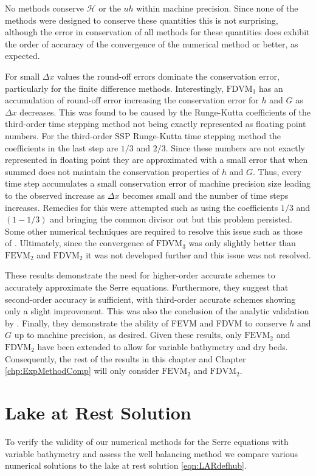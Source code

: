 No methods conserve $\mathcal{H}$ or the $uh$ within machine precision. Since none of the methods were designed to conserve these quantities this is not surprising, although the error in conservation of all methods for these quantities does exhibit the order of accuracy of the convergence of the numerical method or better, as expected. 

For small $\Delta x$ values the round-off errors dominate the conservation error, particularly for the finite difference methods. Interestingly, $\text{FDVM}_3$ has an accumulation of round-off error increasing the conservation error for $h$ and $G$ as $\Delta x$ decreases. This was found to be caused by the Runge-Kutta coefficients of the third-order time stepping method \cite{Zoppou-etal-2017} not being exactly represented as floating point numbers. For the third-order SSP Runge-Kutta time stepping method the coefficients in the last step are $1/3$ and $2/3$. Since these numbers are not exactly represented in floating point they are approximated with a small error that when summed does not maintain the conservation properties of $h$ and $G$. Thus, every time step accumulates a small conservation error of machine precision size leading to the observed increase as $\Delta x$ becomes small and the number of time steps increases. Remedies for this were attempted such as using the coefficients $1/3$ and $(1- 1/3)$ and bringing the common divisor out but this problem persisted. Some other numerical techniques are required to resolve this issue such as those of \citet{higham2002}. Ultimately, since the convergence of $\text{FDVM}_3$ was only slightly better than $\text{FEVM}_2$ and $\text{FDVM}_2$ \cite{Zoppou-etal-2017} it was not developed further and this issue was not resolved.

These results demonstrate the need for higher-order accurate schemes to accurately approximate the Serre equations. Furthermore, they suggest that second-order accuracy is sufficient, with third-order accurate schemes showing only a slight improvement. This was also the conclusion of the analytic validation by \citet{Zoppou-etal-2017}. Finally, they demonstrate the ability of FEVM and FDVM to conserve $h$ and $G$ up to machine precision, as desired. Given these results, only $\text{FEVM}_2$ and $\text{FDVM}_2$ have been extended to allow for variable bathymetry and dry beds. Consequently, the rest of the results in this chapter and Chapter \ref{chp:ExpMethodComp} will only consider $\text{FEVM}_2$ and $\text{FDVM}_2$. 

\section{Lake at Rest Solution}
To verify the validity of our numerical methods for the Serre equations with variable bathymetry and assess the well balancing method we compare various numerical solutions to the lake at rest solution \eqref{eqn:LARdefhub}.

